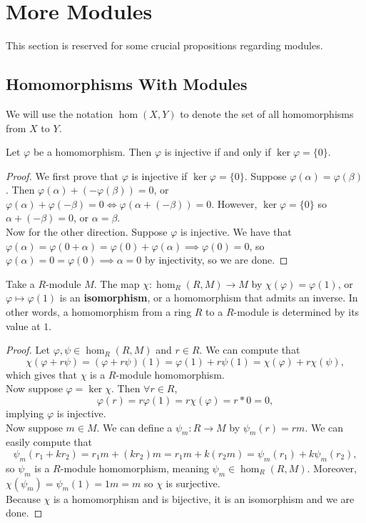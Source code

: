 \section{More Modules}
This section is reserved for some crucial propositions regarding
modules.

\subsection{Homomorphisms With Modules}

\begin{df}
We will use the notation $\hom(X, Y)$ to denote the set of all
homomorphisms from $X$ to $Y$.
\end{df}

\begin{prop}
Let $\varphi$ be a homomorphism. Then $\varphi$ is injective if and only
if $\ker \varphi = \lbrace 0 \rbrace$.
\end{prop}
\begin{proof}
We first prove that $\varphi$ is injective if $\ker \varphi = \lbrace 0
\rbrace$. Suppose $\varphi(\alpha) = \varphi(\beta)$. Then
$\varphi(\alpha) + (-\varphi(\beta)) = 0$, or $\varphi(\alpha) +
\varphi(-\beta) = 0 \iff \varphi(\alpha + (-\beta)) = 0$. However, $\ker
\varphi = \lbrace 0 \rbrace$ so $\alpha + (-\beta) = 0$, or $\alpha =
\beta$. \\
Now for the other direction. Suppose $\varphi$ is injective. We have
that $\varphi(\alpha) = \varphi(0 + \alpha) = \varphi(0) +
\varphi(\alpha) \implies \varphi(0) = 0$, so $\varphi(\alpha) = 0 =
\varphi(0) \implies \alpha = 0$ by injectivity, so we are done.
\end{proof}

\begin{prop}
Take a $R$-module $M$. The map $\chi : \hom_R(R, M) \rightarrow M$ by
$\chi(\varphi) = \varphi(1)$, or $\varphi \mapsto \varphi(1)$ is an
\textbf{isomorphism}, or a homomorphism that admits an inverse. In other
words, a homomorphism from a ring $R$ to a $R$-module is determined by
its value at $1$.
\end{prop}
\begin{proof}
Let $\varphi, \psi \in \hom_R(R, M)$ and $r \in R$. We can compute that
\[ \chi(\varphi + r \psi) = (\varphi + r \psi)(1) = \varphi(1) + r
\psi(1) = \chi(\varphi) + r \chi(\psi), \]
which gives that $\chi$ is a $R$-module homomorphism. \\
Now suppose $\varphi = \ker \chi$. Then $\forall r \in R$, 
\[ \varphi(r) = r \varphi(1) = r \chi(\varphi) = r * 0 = 0, \]
implying $\varphi$ is injective. \\
Now suppose $m \in M$. We can define a $\psi_m : R \rightarrow M$ by
$\psi_m(r) = rm$. We can easily compute that
\[ \psi_m(r_1 + k r_2) = r_1 m + (k r_2) m = r_1 m + k (r_2 m) =
\psi_m(r_1) + k \psi_m(r_2), \]
so $\psi_m$ is a $R$-module homomorphism, meaning $\psi_m \in \hom_R(R,
M)$. Moreover, $\chi(\psi_m) = \psi_m(1) = 1m = m$ so $\chi$ is
surjective. \\
Because $\chi$ is a homomorphism and is bijective, it is an isomorphism
and we are done.
\end{proof}

